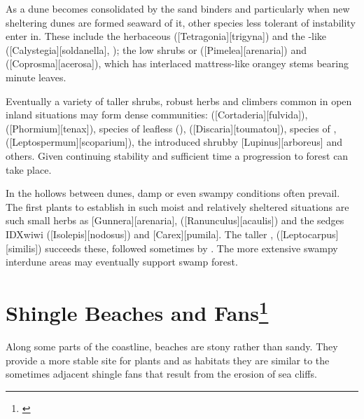 As a dune becomes consolidated by the sand binders and particularly when new sheltering dunes are formed seaward of it, other species less tolerant of instability enter in.
These include the herbaceous  ([Tetragonia][trigyna]) and the -like  ([Calystegia][soldanella], ); the low shrubs  or  ([Pimelea][arenaria]) and  ([Coprosma][acerosa]), which has interlaced mattress-like orangey stems bearing minute leaves.

Eventually a variety of taller shrubs, robust herbs and climbers common in open inland situations may form dense communities:  ([Cortaderia][fulvida]),  ([Phormium][tenax]), species of leafless  (),  ([Discaria][toumatou]), species of ,  ([Leptospermum][scoparium]), the introduced shrubby [Lupinus][arboreus] and others.
Given continuing stability and sufficient time a progression to forest can take place.

In the hollows between dunes, damp or even swampy conditions often prevail.
The first plants to establish in such moist and relatively sheltered situations are such small herbs as [Gunnera][arenaria],  ([Ranunculus][acaulis]) and the sedges IDX{wiwi} ([Isolepis][nodosus]) and [Carex][pumila].
The taller ,  ([Leptocarpus][similis]) succeeds these, followed sometimes by .
The more extensive swampy interdune areas may eventually support swamp forest.

\section[Shingle Beaches and Fans]{Shingle Beaches and Fans\thinspace\footnote{\cite{moore1963plants}}}

Along some parts of the coastline, beaches are stony rather than sandy.
They provide a more stable site for plants and as habitats they are similar to the sometimes adjacent shingle fans that result from the erosion of sea cliffs.

